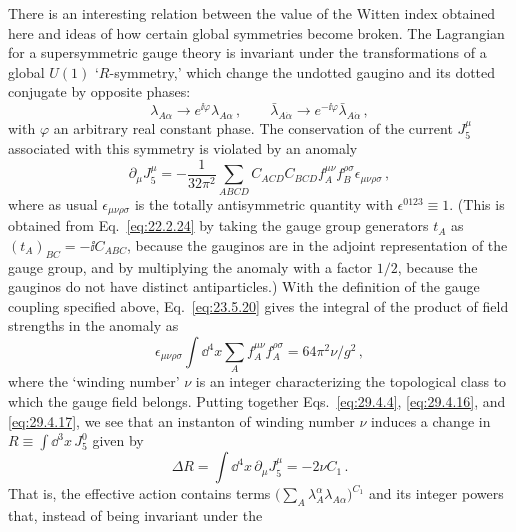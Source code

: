 There is an interesting relation between the value of the Witten index
obtained here and ideas of how certain global symmetries become broken.
The Lagrangian for a supersymmetric gauge theory is invariant under the
transformations of a global \(U(1)\) `\(R\)-symmetry,' which change the
undotted gaugino and its dotted conjugate by opposite phases:
\begin{equation}
  \lambda_{A\alpha}\longrightarrow
    e^{\ii\varphi}\lambda_{A\alpha}\,,
  \qquad
  \bar\lambda_{A\dot\alpha}\longrightarrow
    e^{-\ii\varphi}\bar\lambda_{A\dot\alpha}\,,
  \tag{29.4.15}\label{eq:29.4.15}
\end{equation}
with \(\varphi\) an arbitrary real constant phase. The conservation of the
current \(J_5^\mu\) associated with this symmetry is violated by an anomaly
\begin{equation}
  \partial_\mu J_5^\mu
  =
  -\frac{1}{32\pi^2}
  \sum_{ABCD}
  C_{ACD}C_{BCD}
  f_A^{\mu\nu}f_B^{\rho\sigma}
  \epsilon_{\mu\nu\rho\sigma}\,,
  \tag{29.4.16}\label{eq:29.4.16}
\end{equation}
where as usual \(\epsilon_{\mu\nu\rho\sigma}\) is the totally
antisymmetric quantity with \(\epsilon^{0123}\equiv1\). (This is obtained
from Eq.~\eqref{eq:22.2.24} by taking the gauge group generators \(t_A\) as
\((t_A)_{BC}=-\ii C_{ABC}\), because the gauginos are in the adjoint
representation of the gauge group, and by multiplying the anomaly with a
factor \(1/2\), because the gauginos do not have distinct antiparticles.)
With the definition of the gauge coupling specified above,
Eq.~\eqref{eq:23.5.20} gives the integral of the product of field strengths
in the anomaly as
\begin{equation}
  \epsilon_{\mu\nu\rho\sigma}
  \int \dd^4x\sum_A f_A^{\mu\nu}f_A^{\rho\sigma}
  =64\pi^2\nu/g^2\,,
  \tag{29.4.17}\label{eq:29.4.17}
\end{equation}
where the `winding number' \(\nu\) is an integer characterizing the
topological class to which the gauge field belongs. Putting together
Eqs.~\eqref{eq:29.4.4}, \eqref{eq:29.4.16}, and \eqref{eq:29.4.17}, we
see that an instanton of winding number \(\nu\) induces a change in
\(R\equiv\int \dd^3x\,J_5^0\) given by
\begin{equation}
  \Delta R
  =
  \int \dd^4x\,\partial_\mu J_5^\mu
  =-2\nu C_1\,.
  \tag{29.4.18}\label{eq:29.4.18}
\end{equation}
That is, the effective action contains terms
\(\bigl(\sum_A\lambda_A^\alpha\lambda_{A\alpha}\bigr)^{C_1}\) and
its integer powers that, instead of being invariant under the
